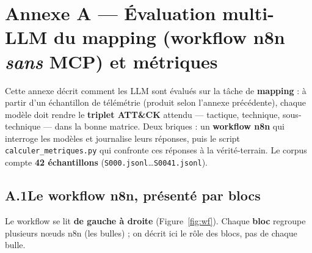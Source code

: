 \pagestyle{empty}

\section*{Annexe A — Évaluation multi-LLM du mapping (workflow n8n \emph{sans} MCP) et métriques}

Cette annexe décrit comment les LLM sont évalués sur la tâche de \textbf{mapping} :
à partir d'un échantillon de télémétrie (produit selon l'annexe précédente),
chaque modèle doit rendre le \textbf{triplet ATT\&CK} attendu — tactique,
technique, sous-technique — dans la bonne matrice. Deux briques : un
\textbf{workflow n8n} qui interroge les modèles et journalise leurs réponses, puis
le script \lstinline|calculer_metriques.py| qui confronte ces réponses à la
vérité-terrain. Le corpus compte \textbf{42 échantillons}
(\texttt{S000.jsonl}\dots\texttt{S0041.jsonl}).

\subsection*{A.1\quad Le workflow n8n, présenté par blocs}
Le workflow se lit \textbf{de gauche à droite} (Figure~\ref{fig:wf}). Chaque
\textbf{bloc} regroupe plusieurs nœuds n8n (les bulles) ; on décrit ici le rôle
des blocs, pas de chaque bulle.

